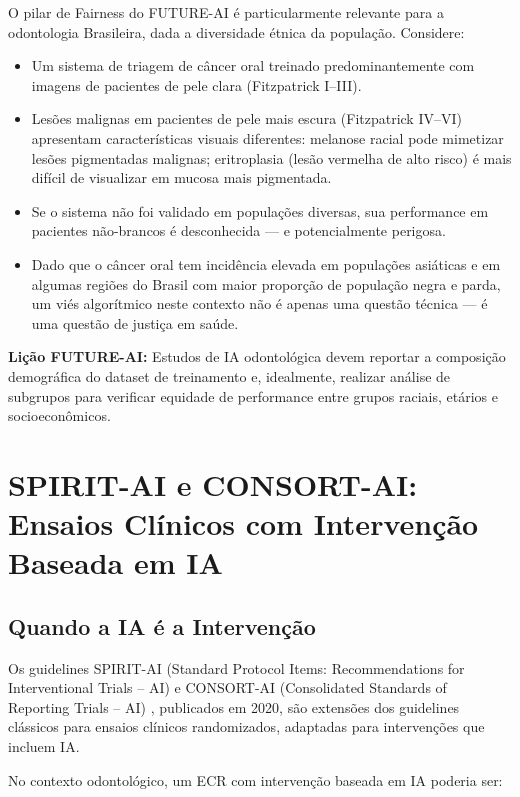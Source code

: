 O pilar de Fairness do FUTURE-AI é particularmente relevante para a odontologia Brasileira, dada a diversidade étnica da população. Considere:

\begin{itemize}
    \item Um sistema de triagem de câncer oral treinado predominantemente com imagens de pacientes de pele clara (Fitzpatrick I--III).
    \item Lesões malignas em pacientes de pele mais escura (Fitzpatrick IV--VI) apresentam características visuais diferentes: melanose racial pode mimetizar lesões pigmentadas malignas; eritroplasia (lesão vermelha de alto risco) é mais difícil de visualizar em mucosa mais pigmentada.
    \item Se o sistema não foi validado em populações diversas, sua performance em pacientes não-brancos é desconhecida — e potencialmente perigosa.
    \item Dado que o câncer oral tem incidência elevada em populações asiáticas e em algumas regiões do Brasil com maior proporção de população negra e parda, um viés algorítmico neste contexto não é apenas uma questão técnica — é uma questão de justiça em saúde.
\end{itemize}

\textbf{Lição FUTURE-AI:} Estudos de IA odontológica devem reportar a composição demográfica do dataset de treinamento e, idealmente, realizar análise de subgrupos para verificar equidade de performance entre grupos raciais, etários e socioeconômicos.

\section{SPIRIT-AI e CONSORT-AI: Ensaios Clínicos com Intervenção Baseada em IA}

\subsection{Quando a IA é a Intervenção}

Os guidelines SPIRIT-AI (Standard Protocol Items: Recommendations for Interventional Trials -- AI) e CONSORT-AI (Consolidated Standards of Reporting Trials -- AI) , publicados em 2020, são extensões dos guidelines clássicos para ensaios clínicos randomizados, adaptadas para intervenções que incluem IA.

No contexto odontológico, um ECR com intervenção baseada em IA poderia ser:

